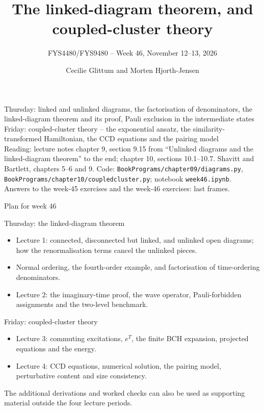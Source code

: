 \documentclass[aspectratio=169,10pt]{beamer}
\title{The linked-diagram theorem, and coupled-cluster theory}
\subtitle{FYS4480/FYS9480 -- Week 46, November 12--13, 2026}
\author{Cecilie Glittum and Morten Hjorth-Jensen}
\institute{Department of Physics,\\
University of Oslo, Norway}
\date{}
\begin{document}
\begin{frame}[plain]
  \vfill
  \begin{center}\small
  Thursday: linked and unlinked diagrams, the factorisation of denominators, the linked-diagram theorem and its proof, Pauli exclusion in the intermediate states\\
  Friday: coupled-cluster theory -- the exponential ansatz, the similarity-transformed Hamiltonian, the CCD equations and the pairing model\\[0.55em]
  {\footnotesize Reading: lecture notes chapter 9, section 9.15 from ``Unlinked diagrams and the linked-diagram theorem'' to the end; chapter 10, sections 10.1--10.7. Shavitt and Bartlett, chapters 5--6 and 9. Code: \texttt{BookPrograms/chapter09/diagrams.py}, \texttt{BookPrograms/chapter10/coupledcluster.py}; notebook \texttt{week46.ipynb}.\\[0.2em]
  Answers to the week-45 exercises and the week-46 exercises: last frames.}
  \end{center}
\end{frame}

\begin{frame}{Plan for week 46}
\small
\begin{block}{Thursday: the linked-diagram theorem}
\begin{itemize}
\item Lecture 1: connected, disconnected but linked, and unlinked open diagrams; how the renormalisation terms cancel the unlinked pieces.
\item Normal ordering, the fourth-order example, and factorisation of time-ordering denominators.
\item Lecture 2: the imaginary-time proof, the wave operator, Pauli-forbidden assignments and the two-level benchmark.
\end{itemize}
\end{block}
\begin{block}{Friday: coupled-cluster theory}
\begin{itemize}
\item Lecture 3: commuting excitations, $e^T$, the finite BCH expansion, projected equations and the energy.
\item Lecture 4: CCD equations, numerical solution, the pairing model, perturbative content and size consistency.
\end{itemize}
\end{block}
\small The additional derivations and worked checks can also be used as supporting material outside the four lecture periods.
\end{frame}
\end{document}
